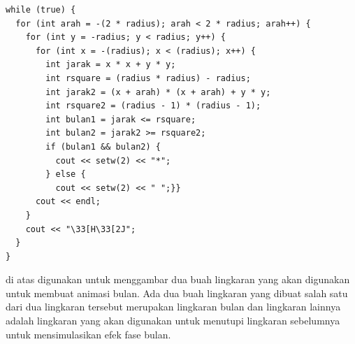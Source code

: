 \documentclass[../main.tex]{subfiles}
\begin{document}
\begin{code}
\begin{verbatim}
while (true) {
  for (int arah = -(2 * radius); arah < 2 * radius; arah++) {
    for (int y = -radius; y < radius; y++) {
      for (int x = -(radius); x < (radius); x++) {
        int jarak = x * x + y * y;
        int rsquare = (radius * radius) - radius;
        int jarak2 = (x + arah) * (x + arah) + y * y;
        int rsquare2 = (radius - 1) * (radius - 1);
        int bulan1 = jarak <= rsquare;
        int bulan2 = jarak2 >= rsquare2;
        if (bulan1 && bulan2) {
          cout << setw(2) << "*";
        } else {
          cout << setw(2) << " ";}}
      cout << endl;
    }
    cout << "\33[H\33[2J";
  }
}
\end{verbatim}
\end{code}

{\Script} di atas digunakan untuk menggambar dua buah lingkaran yang akan digunakan untuk membuat animasi bulan. Ada dua buah lingkaran yang dibuat salah satu dari dua lingkaran tersebut merupakan lingkaran bulan dan lingkaran lainnya adalah lingkaran yang akan digunakan untuk menutupi lingkaran sebelumnya untuk mensimulasikan efek fase bulan.
\end{document}

